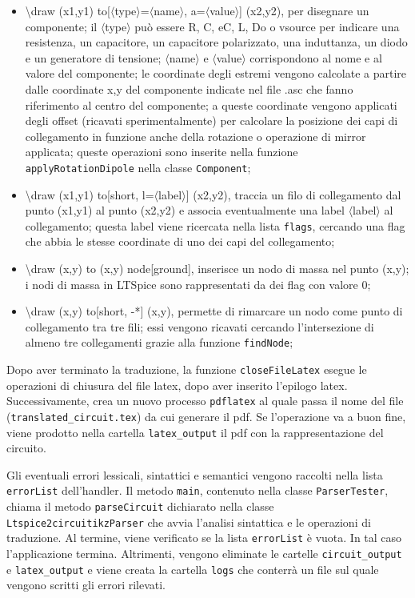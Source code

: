 \begin{itemize}
	\item \textbackslash draw (x1,y1) to[$\langle$type$\rangle$=$\langle$name$\rangle$, a=$\langle$value$\rangle$] (x2,y2), per disegnare un componente; il $\langle$type$\rangle$ può essere R, C, eC, L, Do o vsource per indicare una resistenza, un capacitore, un capacitore polarizzato, una induttanza, un diodo e un generatore di tensione; $\langle$name$\rangle$ e $\langle$value$\rangle$ corrispondono al nome e al valore del componente; le coordinate degli estremi vengono calcolate a partire dalle coordinate x,y del componente indicate nel file .asc che fanno riferimento al centro del componente; a queste coordinate vengono applicati degli offset (ricavati sperimentalmente) per calcolare la posizione dei capi di collegamento in funzione anche della rotazione o operazione di mirror applicata; queste operazioni sono inserite nella funzione \texttt{applyRotationDipole} nella classe \texttt{Component};
	\item \textbackslash draw (x1,y1) to[short, l=$\langle$label$\rangle$] (x2,y2), traccia un filo di collegamento dal punto (x1,y1) al punto (x2,y2) e associa eventualmente una label $\langle$label$\rangle$ al collegamento; questa label viene ricercata nella lista \texttt{flags}, cercando una flag che abbia le stesse coordinate di uno dei capi del collegamento;
	\item \textbackslash draw (x,y) to (x,y) node[ground]{}, inserisce un nodo di massa nel punto (x,y); i nodi di massa in LTSpice sono rappresentati da dei flag con valore 0;
	\item \textbackslash draw (x,y) to[short, -*] (x,y), permette di rimarcare un nodo come punto di collegamento tra tre fili; essi vengono ricavati cercando l'intersezione di almeno tre collegamenti grazie alla funzione \texttt{findNode};
\end{itemize}
Dopo aver terminato la traduzione, la funzione \texttt{closeFileLatex} esegue le operazioni di chiusura del file latex, dopo aver inserito l'epilogo latex. Successivamente, crea un nuovo processo \texttt{pdflatex} al quale passa il nome del file (\texttt{translated\_circuit.tex}) da cui generare il pdf. Se l'operazione va a buon fine, viene prodotto nella cartella \texttt{latex\_output} il pdf con la rappresentazione del circuito.

\noindent
Gli eventuali errori lessicali, sintattici e semantici vengono raccolti nella lista \texttt{errorList} dell'handler. Il metodo \texttt{main}, contenuto nella classe \texttt{ParserTester}, chiama il metodo \texttt{parseCircuit} dichiarato nella classe \texttt{Ltspice2circuitikzParser} che avvia l'analisi sintattica e le operazioni di traduzione. Al termine, viene verificato se la lista \texttt{errorList} è vuota. In tal caso l'applicazione termina. Altrimenti, vengono eliminate le cartelle \texttt{circuit\_output} e \texttt{latex\_output} e viene creata la cartella \texttt{logs} che conterrà un file sul quale vengono scritti gli errori rilevati.

